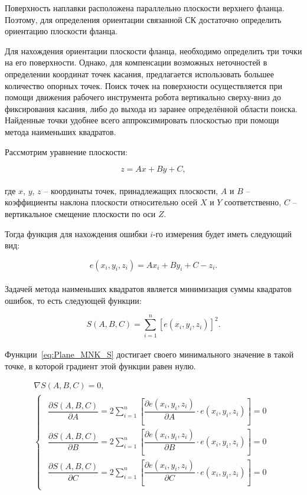 Поверхность наплавки расположена параллельно плоскости верхнего фланца.
Поэтому, для определения ориентации связанной СК достаточно определить ориентацию плоскости фланца.

Для нахождения ориентации плоскости фланца, необходимо определить три точки на его поверхности.
Однако, для компенсации возможных неточностей в определении координат точек касания, предлагается использовать большее количество опорных точек.
Поиск точек на поверхности осуществляется при помощи движения рабочего инструмента робота вертикально сверху-вниз до фиксирования касания, либо до выхода из заранее определённой области поиска.
Найденные точки удобнее всего аппроксимировать плоскостью при помощи метода наименьших квадратов.

Рассмотрим уравнение плоскости:

\begin{equation}
    \label{eq:Plane}
    z = A x + B y + C,
\end{equation} \\
где $x$, $y$, $z$ -- координаты точек, принадлежащих плоскости, $A$ и $B$ -- коэффициенты наклона плоскости относительно осей $X$ и $Y$ соответственно, $C$ -- вертикальное смещение плоскости по оси $Z$.

Тогда функция для нахождения ошибки $i$-го измерения будет иметь следующий вид:

\begin{equation}
    \label{eq:Plane_MNK_e}
    e(x_i, y_i, z_i) = A x_i + B y_i + C - z_i.
\end{equation} \\

Задачей метода наименьших квадратов является минимизация суммы квадратов ошибок, то есть следующей функции:

\begin{equation}
    \label{eq:Plane_MNK_S}
    S(A, B, C) = \sum_{i=1}^{n} \left[ e(x_i, y_i, z_i) \right]^2.
\end{equation} \\

Функции~\ref{eq:Plane_MNK_S} достигает своего минимального значение в такой точке, в которой градиент этой функции равен нулю.

\begin{gather*}
    \nabla S(A, B, C) = 0, \\
    \begin{cases}
        \begin{aligned}
            \dfrac{\partial S(A, B, C)}{\partial A} = 2 \sum_{i=1}^{n} \left[
            \dfrac{\partial e(x_i, y_i, z_i)}{\partial A} \cdot e(x_i, y_i, z_i) \right] = 0 \\
            \dfrac{\partial S(A, B, C)}{\partial B} = 2 \sum_{i=1}^{n} \left[
            \dfrac{\partial e(x_i, y_i, z_i)}{\partial B} \cdot e(x_i, y_i, z_i) \right] = 0 \\
            \dfrac{\partial S(A, B, C)}{\partial C} = 2 \sum_{i=1}^{n} \left[
            \dfrac{\partial e(x_i, y_i, z_i)}{\partial C} \cdot e(x_i, y_i, z_i) \right] = 0
        \end{aligned}
    \end{cases}
\end{gather*}

